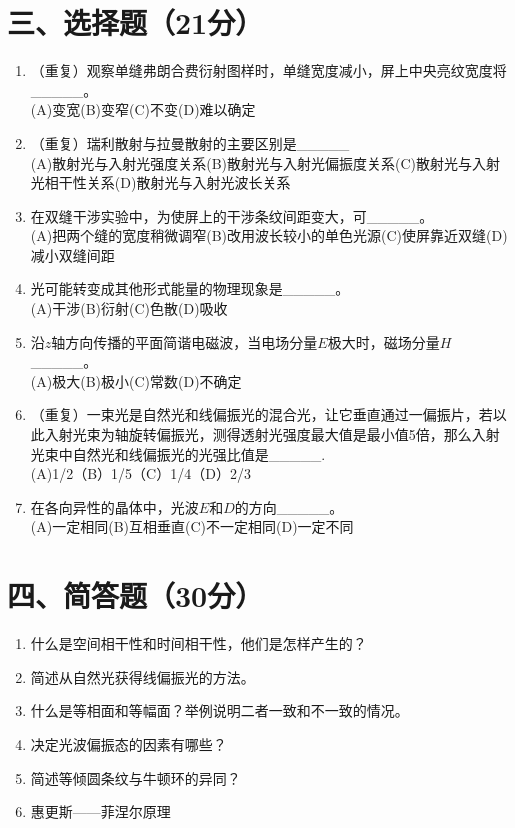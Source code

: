 \documentclass[12pt, a4paper]{article}
\theoremstyle{solution}
\begin{document}
\section*{三、选择题（21分）}
\begin{enumerate}
    \item （重复）观察单缝弗朗合费衍射图样时，单缝宽度减小，屏上中央亮纹宽度将\_\_\_\_\_。\\(A)变宽\quad (B)变窄\quad (C)不变\quad (D)难以确定
    \item （重复）瑞利散射与拉曼散射的主要区别是\_\_\_\_\_\\(A)散射光与入射光强度关系\quad(B)散射光与入射光偏振度关系\quad (C)散射光与入射光相干性关系\quad (D)散射光与入射光波长关系
    \item 在双缝干涉实验中，为使屏上的干涉条纹间距变大，可\_\_\_\_\_。\\(A)把两个缝的宽度稍微调窄\quad(B)改用波长较小的单色光源\quad (C)使屏靠近双缝\quad (D)减小双缝间距
    \item 光可能转变成其他形式能量的物理现象是\_\_\_\_\_。\\(A)干涉\quad(B)衍射\quad(C)色散\quad(D)吸收
    \item 沿$z$轴方向传播的平面简谐电磁波，当电场分量$E$极大时，磁场分量$H$\_\_\_\_\_。\\(A)极大\quad(B)极小\quad(C)常数\quad(D)不确定
    \item （重复）一束光是自然光和线偏振光的混合光，让它垂直通过一偏振片，若以此入射光束为轴旋转偏振光，测得透射光强度最大值是最小值5倍，那么入射光束中自然光和线偏振光的光强比值是\_\_\_\_\_.\\(A)1/2\qquad（B）1/5\qquad（C）1/4\qquad（D）2/3
    \item 在各向异性的晶体中，光波$E$和$D$的方向\_\_\_\_\_。\\(A)一定相同\quad(B)互相垂直\quad(C)不一定相同\quad(D)一定不同
\end{enumerate}
\section*{四、简答题（30分）}
\begin{enumerate}
    \item 什么是空间相干性和时间相干性，他们是怎样产生的？
    \item 简述从自然光获得线偏振光的方法。
    \item 什么是等相面和等幅面？举例说明二者一致和不一致的情况。
    \item 决定光波偏振态的因素有哪些？
    \item 简述等倾圆条纹与牛顿环的异同？
    \item 惠更斯——菲涅尔原理
\end{enumerate}
\end{document}
